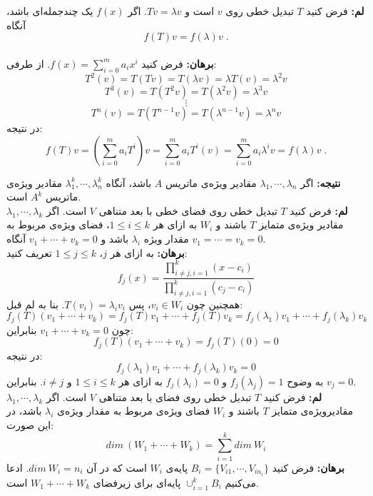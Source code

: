 
\textbf{لم:} فرض کنید $T$ تبدیل خطی روی $v$ است و $Tv = \lambda v$. اگر $f(x)$ یک چند‌جمله‌ای باشد، آنگاه $$f(T)v = f(\lambda)v\;.$$\\
\textbf{برهان:} فرض کنید $f(x) = \sum_{i=0}^{m} a_ix^i$. از طرفی:
$$T^2(v) = T(Tv) = T(\lambda v) = \lambda T(v) =\lambda^2v$$
$$T^3(v) = T(T^2v) = T(\lambda^2v) = \lambda^3v$$
$$\vdots$$
$$T^n(v) = T(T^{n-1}v) = T(\lambda^{n-1} v) = \lambda^n v$$
در نتیجه:
$$f(T)v = (\sum_{i=0}^m a_i T^i)v = \sum_{i=0}^m a_i T^i(v) = \sum_{i=0}^m a_i \lambda^i v = f(\lambda) v \; .   $$

\textbf{نتیجه:} اگر $\lambda_1 , \cdots , \lambda_n$ مقادیر ویژه‌ی ماتریس $A$ باشد، آنگاه $\lambda_1^k , \cdots, \lambda_n^k$ مقادیر ویژه‌ی ماتریس $A^k$ است.\\
\textbf{لم:} فرض کنید $T$ تبدیل خطی روی فضا‌ی خطی با بعد متناهی $V$ است. اگر $\lambda_1 , \cdots, \lambda_k$ مقادیر ویژه‌ی متمایز $T$ باشند و $W_i$ به ازای هر $1\leq i \leq k$، فضا‌ی ویژه‌ی مربوط به مقدار ویژه $\lambda_i$ باشد و $v_1+\cdots+v_k = 0$ آنگاه $v_1 = \cdots = v_k= 0$.\\
\textbf{برهان:} به ازای هر $j$، $1\leq j \leq k$ تعریف کنید:
$$f_j(x) = \frac{\prod_{i\neq j , i=1}^k (x - c_i)}{\prod_{i\neq j , i=1}^k (c_j - c_i)}$$
همچنین چون $v_i \in W_i$، پس $T(v_i) = \lambda_iv_i$. بنا به لم قبل:
$$f_j(T)(v_1+\cdots+v_k) = f_j(T)v_1 + \cdots+ f_j(T)v_k = f_j(\lambda_1)v_1 + \cdots + f_j(\lambda_k)v_k$$
چون $v_1+\cdots+v_k = 0$ بنابراین:
$$f_j(T)(v_1+\cdots+v_k) = f_j(T)(0) = 0$$
در نتیجه:
$$f_j(\lambda_1)v_1 + \cdots+ f_j(\lambda_k)v_k  = 0$$
به وضوح $f_j(\lambda_j) = 1$ و $f_j(\lambda_i) = 0$ به ازای هر $1\leq i\leq k$ و $i\neq j$. بنابراین $v_j = 0$.\\
\textbf{لم:} فرض کنید $T$ تبدیل خطی روی فضا‌ی با بعد متناهی $V$ است. اگر $\lambda_1,\cdots,\lambda_k$ مقادیر‌ویژه‌ی متمایز $T$ باشند و $W_i$ فضا‌ی ویژه‌ی مربوط به مقدار ویژه‌ی $\lambda_i$ باشد، در این صورت:
$$dim\: (W_1 + \cdots+ W_k) = \sum_{i=1}^k dim \: W_i$$
\textbf{برهان:} فرض کنید $B_i = \{V_{i1} , \cdots, V_{i{n_i}}\}$ پایه‌ی $W_i$ است که در آن $dim \:W_i = n_i$. ادعا می‌کنیم $\cup_{i=1}^k B_i$ پایه‌ای برای زیر‌فضا‌ی  $W_1+\cdots+W_k$ است.\\
